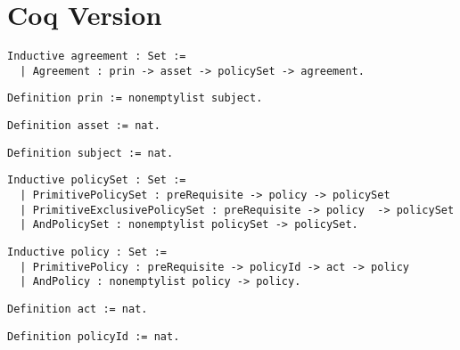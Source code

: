 \section{Coq Version}

\lstset{language=Coq}
\begin{lstlisting}[frame=single, caption={Coq version of agreement},label={lst:agreementcoq}]
Inductive agreement : Set :=
  | Agreement : prin -> asset -> policySet -> agreement.
\end{lstlisting}

\lstset{language=Coq}
\begin{lstlisting}[frame=single, caption={prin},label={lst:princoq}]
Definition prin := nonemptylist subject.
\end{lstlisting}

\lstset{language=Coq}
\begin{lstlisting}[frame=single, caption={asset},label={lst:assetcoq}]
Definition asset := nat.
\end{lstlisting}



\lstset{language=Coq}
\begin{lstlisting}[frame=single, caption={subject},label={lst:subjectcoq}]
Definition subject := nat.
\end{lstlisting}


\lstset{language=Coq}
\begin{lstlisting}[frame=single, caption={policySet},label={lst:policySetcoq}]
Inductive policySet : Set :=
  | PrimitivePolicySet : preRequisite -> policy -> policySet 
  | PrimitiveExclusivePolicySet : preRequisite -> policy  -> policySet 
  | AndPolicySet : nonemptylist policySet -> policySet.
\end{lstlisting}

\lstset{language=Coq}
\begin{lstlisting}[frame=single, caption={policy},label={lst:policycoq}]
Inductive policy : Set :=
  | PrimitivePolicy : preRequisite -> policyId -> act -> policy 
  | AndPolicy : nonemptylist policy -> policy.
\end{lstlisting}

\lstset{language=Coq}
\begin{lstlisting}[frame=single, caption={act},label={lst:actcoq}]
Definition act := nat.
\end{lstlisting}

\lstset{language=Coq}
\begin{lstlisting}[frame=single, caption={policyId},label={lst:policyIdcoq}]
Definition policyId := nat.
\end{lstlisting}

